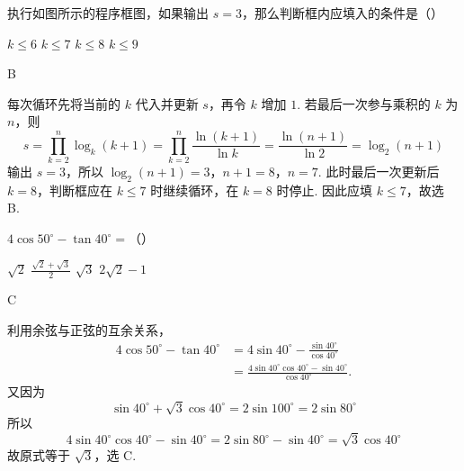\begin{problem}
执行如图所示的程序框图，如果输出 \(s = 3\)，那么判断框内应填入的条件是（\quad）


\choices
    {\(k \leqslant 6\)}
    {\(k \leqslant 7\)}
    {\(k \leqslant 8\)}
    {\(k \leqslant 9\)}

\begin{answer}
B
\end{answer}

\begin{solution}
每次循环先将当前的 \(k\) 代入并更新 \(s\)，再令 \(k\) 增加 \(1\). 若最后一次参与乘积的 \(k\) 为 \(n\)，则
\[
s=\prod_{k=2}^{n}\log_k(k+1)
=\prod_{k=2}^{n}\frac{\ln(k+1)}{\ln k}
=\frac{\ln(n+1)}{\ln2}=\log_2(n+1)
\]
输出 \(s=3\)，所以
\(\log_2(n+1)=3\)，\(n+1=8\)，\(n=7\).
此时最后一次更新后 \(k=8\)，判断框应在 \(k\leqslant7\) 时继续循环，在 \(k=8\) 时停止. 因此应填 \(k\leqslant7\)，故选 B.
\end{solution}
\end{problem}

\begin{problem}
\(4\cos 50^{\circ} - \tan 40^{\circ} =\)（\quad）

\choices
    {\(\sqrt{2}\)}
    {\(\frac{\sqrt{2} + \sqrt{3}}{2}\)}
    {\(\sqrt{3}\)}
    {\(2\sqrt{2} - 1\)}

\begin{answer}
C
\end{answer}

\begin{solution}
利用余弦与正弦的互余关系，
\[
\begin{aligned}
4\cos50^{\circ}-\tan40^{\circ}
&=4\sin40^{\circ}-\frac{\sin40^{\circ}}{\cos40^{\circ}}\\
&=\frac{4\sin40^{\circ}\cos40^{\circ}-\sin40^{\circ}}{\cos40^{\circ}}.
\end{aligned}
\]
又因为
\[
\sin40^{\circ}+\sqrt{3}\cos40^{\circ}
=2\sin100^{\circ}=2\sin80^{\circ}
\]
所以
\[
4\sin40^{\circ}\cos40^{\circ}-\sin40^{\circ}
=2\sin80^{\circ}-\sin40^{\circ}
=\sqrt{3}\cos40^{\circ}
\]
故原式等于 \(\sqrt{3}\)，选 C.
\end{solution}
\end{problem}


